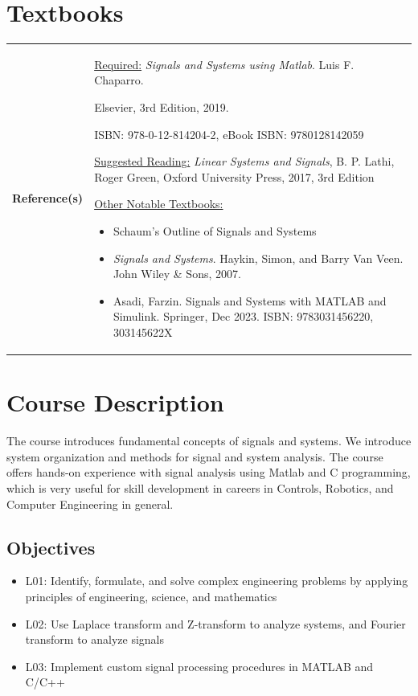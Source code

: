 \documentclass[11pt]{report}
\begin{document}
\chapter{Textbooks}
\begin{tabular}{>{\raggedright\arraybackslash}p{}>{\raggedright\arraybackslash}p{}}

\textbf{\textcolor{winemaroon}{Reference(s)}}
    & \underline{Required:} \emph{\textcolor{winemaroon}{Signals and Systems using Matlab}}. Luis F. Chaparro. \par{\textcolor{coral!80!black}{Elsevier, 3rd Edition, 2019}}. \par ISBN: 978-0-12-814204-2, eBook ISBN: 9780128142059\par\vspace{7pt}

    \underline{Suggested Reading:} \textit{Linear Systems and Signals}, B. P. Lathi, Roger Green, Oxford University Press, 2017, 3rd Edition\par\vspace{7pt}

    \underline{Other Notable Textbooks:}
        \begin{itemize}
            \item Schaum's Outline of Signals and Systems
            \item \textit{Signals and Systems}. Haykin, Simon, and Barry Van Veen. John Wiley \& Sons, 2007.
            \item Asadi, Farzin. Signals and Systems with MATLAB and Simulink. Springer, Dec 2023. ISBN: 9783031456220, 303145622X
        \end{itemize}

\end{tabular}

\chapter{Course Description}
The course introduces fundamental concepts of signals and systems. We introduce system organization and methods for signal and system analysis. The course offers hands-on experience with signal analysis using Matlab and C programming, which is very useful for skill development in careers in Controls, Robotics, and Computer Engineering in general.

\section*{Objectives}
\begin{itemize}
    \item L01: Identify, formulate, and solve complex engineering problems by applying principles of engineering, science, and mathematics
    \item L02: Use Laplace transform and Z-transform to analyze systems, and Fourier transform to analyze signals
    \item L03: Implement custom signal processing procedures in MATLAB and C/C++
\end{itemize}
\end{document}
